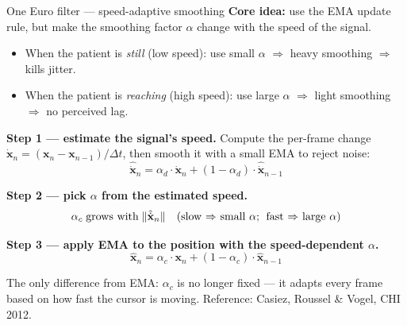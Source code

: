 \documentclass[10pt,aspectratio=169]{beamer}
\begin{document}
\begin{frame}{One Euro filter --- speed-adaptive smoothing}
\textbf{Core idea:} use the EMA update rule, but make the smoothing factor $\alpha$ change with the speed of the signal.
\begin{itemize}
    \item When the patient is \emph{still} (low speed): use small $\alpha$ $\Rightarrow$ heavy smoothing $\Rightarrow$ kills jitter.
    \item When the patient is \emph{reaching} (high speed): use large $\alpha$ $\Rightarrow$ light smoothing $\Rightarrow$ no perceived lag.
\end{itemize}

\textbf{Step 1 --- estimate the signal's speed.}
Compute the per-frame change $\dot{\mathbf{x}}_n = (\mathbf{x}_n - \mathbf{x}_{n-1}) / \Delta t$, then smooth it with a small EMA to reject noise:
\[
\hat{\dot{\mathbf{x}}}_n = \alpha_d \cdot \dot{\mathbf{x}}_n + (1 - \alpha_d) \cdot \hat{\dot{\mathbf{x}}}_{n-1}
\]

\textbf{Step 2 --- pick $\alpha$ from the estimated speed.}
\[
\alpha_c \;\text{grows with}\; \|\hat{\dot{\mathbf{x}}}_n\|
\quad\text{(slow $\Rightarrow$ small $\alpha$;\; fast $\Rightarrow$ large $\alpha$)}
\]

\textbf{Step 3 --- apply EMA to the position with the speed-dependent $\alpha$.}
\[
\hat{\mathbf{x}}_n = \alpha_c \cdot \mathbf{x}_n + (1 - \alpha_c) \cdot \hat{\mathbf{x}}_{n-1}
\]

The only difference from EMA: $\alpha_c$ is no longer fixed --- it adapts every frame based on how fast the cursor is moving. Reference: Casiez, Roussel \& Vogel, CHI 2012.
\end{frame}
\end{document}
